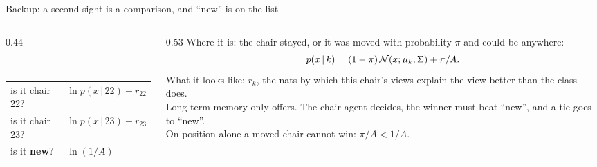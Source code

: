 \documentclass[10pt, aspectratio=169]{beamer}
\begin{document}
\begin{frame}{Backup: a second sight is a comparison, and ``new'' is on the list}
  \begin{columns}[c]
    \begin{column}{0.44\textwidth}
      \centering
      \\[0.4em]
      \footnotesize
      \begin{tabular}{@{}l l@{}}
        is it chair 22? & $\ln p(x\,|\,22) + r_{22}$\\
        is it chair 23? & $\ln p(x\,|\,23) + r_{23}$\\
        is it \textbf{new}? & $\ln (1/A)$\\
      \end{tabular}
    \end{column}
    \begin{column}{0.53\textwidth}
      \small
      Where it is: the chair stayed, or it was moved with probability $\pi$ and could be anywhere:
      \[ p(x\,|\,k) = (1-\pi)\,\mathcal{N}(x;\mu_k,\Sigma) + \pi/A . \]
      What it looks like: $r_k$, the nats by which this chair's views explain the view better than
      the class does.\\[0.5em]
      Long-term memory only offers. The chair agent decides, the winner must beat ``new'', and a tie
      goes to ``new''.\\[0.5em]
      \alert{On position alone a moved chair cannot win: $\pi/A<1/A$.}
    \end{column}
  \end{columns}
\end{frame}
\end{document}
